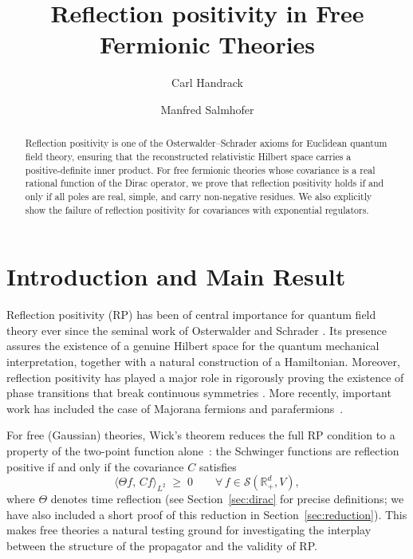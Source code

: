 \documentclass[10pt,a4paper,oneside,reqno]{amsart}
\begin{document}
\title{Reflection positivity in Free Fermionic Theories}
\begin{abstract}
    Reflection positivity is one of the Osterwalder--Schrader axioms for Euclidean quantum field theory, ensuring that the reconstructed relativistic Hilbert space carries a positive-definite inner product. For free fermionic theories whose covariance is a real rational function of the Dirac operator, we prove that reflection positivity holds if and only if all poles are real, simple, and carry non-negative residues. We also explicitly show the failure of reflection positivity for covariances with exponential regulators.
\end{abstract}
 \author{Carl Handrack}
 \author{Manfred Salmhofer}
 \address{Institut f\"ur theoretische Physik, Universit\"at Heidelberg, Philosophenweg 19, 69120 Heidelberg}
\maketitle


\section{Introduction and Main Result}

\noindent
Reflection positivity (RP) has been of central importance for quantum field theory ever since the seminal work of Osterwalder and Schrader \cite{OS1973,OS1975}. Its presence assures the existence of a genuine Hilbert space for the quantum mechanical interpretation, together with a natural construction of a Hamiltonian. Moreover, reflection positivity has played a major role in rigorously proving the existence of phase transitions that break continuous symmetries \cite{FSS1976,FILS1,FILS2}. More recently, important work has included the case of Majorana fermions \cite{JaffeMajorana1,JaffeMajorana2} and parafermions~\cite{JaffeParafermions}. 

For free (Gaussian) theories, Wick's theorem reduces the full RP condition to a property of the two-point function alone~\cite{Glimm1987QuantumPhysics,Bogolubov1990GeneralTheory}: the Schwinger functions are reflection positive if and only if the covariance $C$ satisfies
 \begin{equation}\label{eq:RP-def}
     \langle \Theta f,\, C f \rangle_{L^2} \;\geq\; 0 \qquad \forall\, f \in \mathcal{S}(\mathbb{R}^d_+, V),
 \end{equation}
where $\Theta$ denotes time reflection (see Section~\ref{sec:dirac} for precise definitions; we have also included a short proof of this reduction in Section~\ref{sec:reduction}). This makes free theories a natural testing ground for investigating the interplay between the structure of the propagator and the validity of RP.
 
\end{document}

